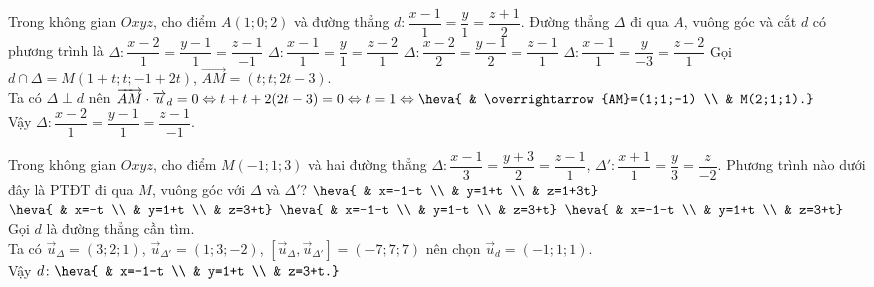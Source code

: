 \begin{ex}%
Trong không gian $Oxyz$, cho điểm  $A(1;0;2)$ và đường thẳng $d\colon \dfrac{x-1}{1}=\dfrac{y}{1}=\dfrac{z+1}{2}$. Đường thẳng $\Delta$ đi qua $A$, vuông góc và cắt $d$ có phương trình là
\choice
{\True $\Delta\colon \dfrac{x-2}{1}=\dfrac{y-1}{1}=\dfrac{z-1}{-1}$}
{$\Delta\colon \dfrac{x-1}{1}=\dfrac{y}{1}=\dfrac{z-2}{1}$}
{$\Delta\colon \dfrac{x-2}{2}=\dfrac{y-1}{2}=\dfrac{z-1}{1}$}
{$\Delta\colon \dfrac{x-1}{1}=\dfrac{y}{-3}=\dfrac{z-2}{1}$}
\loigiai
{
Gọi $d\cap\Delta=M(1+t;t;-1+2t)$, $\overrightarrow{AM}=(t;t;2t-3)$.\\
Ta có $\Delta\perp d$ nên $\overrightarrow{AM}\cdot\overrightarrow{u}_{d}=0 \Leftrightarrow t+t+2(2t-3)=0 \Leftrightarrow t=1 \Leftrightarrow \heva{ & \overrightarrow{AM}=(1;1;-1) \\ & M(2;1;1).}$\\
Vậy $\Delta\colon \dfrac{x-2}{1}=\dfrac{y-1}{1}=\dfrac{z-1}{-1}$.
}
\end{ex}

\begin{ex}%
Trong không gian $Oxyz$, cho điểm  $M(-1;1;3)$ và hai đường thẳng $\Delta\colon \dfrac{x-1}{3}=\dfrac{y+3}{2}=\dfrac{z-1}{1}$, $\Delta'\colon \dfrac{x+1}{1}=\dfrac{y}{3}=\dfrac{z}{-2}$. Phương trình nào dưới đây là PTĐT đi qua $M$, vuông góc với $\Delta$ và $\Delta'$?
\choice
{$\heva{ & x=-1-t \\ & y=1+t \\ & z=1+3t}$}
{$\heva{ & x=-t \\ & y=1+t \\ & z=3+t}$}
{$\heva{ & x=-1-t \\ & y=1-t \\ & z=3+t}$}
{\True $\heva{ & x=-1-t \\ & y=1+t \\ & z=3+t}$}
\loigiai
{
Gọi $d$ là đường thẳng cần tìm.\\
Ta có $\overrightarrow{u}_{\Delta}=(3;2;1)$, $\overrightarrow{u}_{\Delta'}=(1;3;-2)$, $\left[\overrightarrow{u}_{\Delta},\overrightarrow{u}_{\Delta'}\right]=(-7;7;7)$ nên chọn $\overrightarrow{u}_{d}=(-1;1;1)$.\\
Vậy $d\colon \heva{ & x=-1-t \\ & y=1+t \\ & z=3+t.}$
}
\end{ex}

